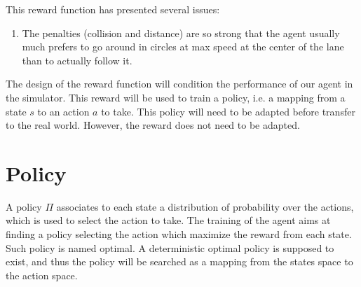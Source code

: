 This reward function has presented several issues:

\begin{enumerate}
    \item The penalties (collision and distance) are so strong that the agent usually much prefers to go around in circles at max speed at the center of the lane than to actually follow it.
\end{enumerate}


The design of the reward function will condition the performance of our agent in the simulator.
This reward will be used to train a policy, i.e. a mapping from a state $s$ to an action $a$ to take.
This policy will need to be adapted before transfer to the real world.
However, the reward does not need to be adapted.

\section{Policy}
A policy $\Pi$ associates to each state a distribution of probability over the actions, which is used to select the action to take.
The training of the agent aims at finding a policy selecting the action which maximize the reward from each state.
Such policy is named optimal.
A deterministic optimal policy is supposed to exist, and thus the policy will be searched as a mapping from the states space to the action space.
